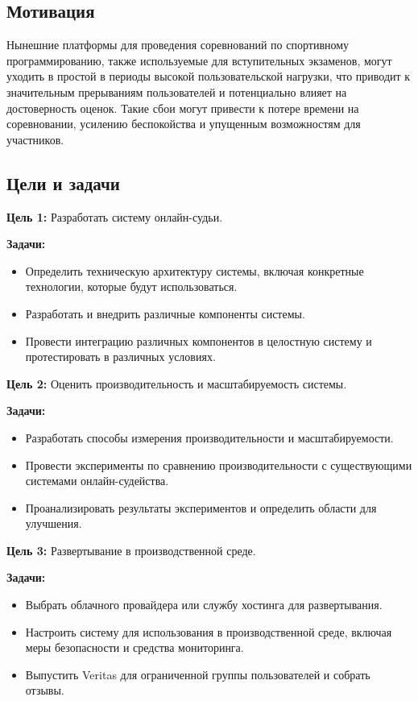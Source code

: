 \subsection{Мотивация}
Нынешние платформы для проведения соревнований по спортивному программированию, также используемые для вступительных экзаменов, могут уходить в простой в периоды высокой пользовательской нагрузки, что приводит к значительным прерываниям пользователей и потенциально влияет на достоверность оценок.
\noindent
Такие сбои могут привести к потере времени на соревновании, усилению беспокойства и упущенным возможностям для участников.

\subsection{Цели и задачи}

\textbf{Цель 1:} Разработать систему онлайн-судьи.

\textbf{Задачи:}
\begin{itemize}
    \itemsep 0em 
    \item Определить техническую архитектуру системы, включая конкретные технологии, которые будут использоваться.
    \item Разработать и внедрить различные компоненты системы.
    \item Провести интеграцию различных компонентов в целостную систему и протестировать в различных условиях.  
\end{itemize}

\noindent
\textbf{Цель 2:} Оценить производительность и масштабируемость системы.

\textbf{Задачи:}
\begin{itemize}
    \itemsep 0em
    \item Разработать способы измерения производительности и масштабируемости.
    \item Провести эксперименты по сравнению производительности с существующими системами онлайн-судейства.
    \item Проанализировать результаты экспериментов и определить области для улучшения.
\end{itemize}

\noindent
\textbf{Цель 3:} Развертывание в производственной среде.

\textbf{Задачи:}
\begin{itemize}
    \itemsep 0em 
    \item Выбрать облачного провайдера или службу хостинга для развертывания.
    \item Настроить систему для использования в производственной среде, включая меры безопасности и средства мониторинга.
    \item Выпустить Veritas для ограниченной группы пользователей и собрать отзывы.
\end{itemize}

